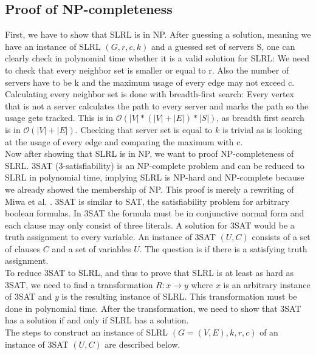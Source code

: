 \documentclass [12pt]{article}
\begin{document}
\subsection{Proof of NP-completeness}
First, we have to show that SLRL is in NP. After guessing a solution, meaning we 
have an instance of SLRL $(G,r,c,k)$ and a guessed set of servers S, one can clearly check 
in polynomial time whether it is a valid solution for SLRL: We need to check that every neighbor set is smaller
or equal to r. Also the number of servers have to be k and the maximum usage of every edge may not exceed c.
Calculating every neighbor set is done with breadth-first search: Every vertex that is not a server calculates
the path to every server and marks the path so the usage gets tracked. This is in $\mathcal{O}(|V|*(|V|+|E|)*|S|)$, as breadth first
search is in $\mathcal{O}(|V|+|E|)$. Checking that server set is equal to $k$ is trivial as is looking at the usage of
every edge and comparing the maximum with c.\\
Now after showing that SLRL is in NP, we want to proof NP-completeness of SLRL.
3SAT (3-satisfiability) is an NP-complete problem \cite{Garey:1979:CIG:578533} and can be reduced to SLRL in polynomial time,
implying SLRL is NP-hard and NP-complete because we already showed the membership of NP. 
This proof is merely a rewriting of Miwa et al. \cite{mirrorserver}.
3SAT is similar to SAT, the satisfiability problem for arbitrary boolean formulas. In 3SAT the formula must be in conjunctive normal form and 
each clause may only consist of three literals. A solution for 3SAT would be a truth assignment to every
variable. An instance of 3SAT $(U,C)$ consists of a set of clauses $C$ and a set of variables $U$. The question is if there is a satisfying
truth assignment.\\
To reduce 3SAT to SLRL, and thus to prove that SLRL is at least as hard as 3SAT, we need to find a 
transformation $R: x \rightarrow y$ where $x$ is an arbitrary instance of 3SAT and $y$ is the resulting instance of SLRL. This transformation must be 
done in polynomial time. After the transformation, we need to show that 3SAT has a solution if and only if 
SLRL has a solution.\\
The steps to construct an instance of SLRL $(G=(V,E),k,r,c)$ of an instance of 3SAT $(U,C)$ are described below.
\end{document}

